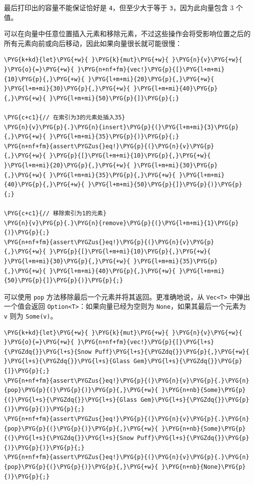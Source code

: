 最后打印出的容量不能保证恰好是 \texttt{4}，但至少大于等于 \texttt{3}，因为此向量包含 3 个值。

可以在向量中任意位置插入元素和移除元素，不过这些操作会将受影响位置之后的所有元素向前或向后移动，因此如果向量很长就可能很慢：

\begin{Verbatim}[commandchars=\\\{\},breaklines=true,breakanywhere=true,fontsize=\codefont,xleftmargin=17bp]
\PYG{k+kd}{let}\PYG{+w}{ }\PYG{k}{mut}\PYG{+w}{ }\PYG{n}{v}\PYG{+w}{ }\PYG{o}{=}\PYG{+w}{ }\PYG{n+nf+fm}{vec!}\PYG{p}{[}\PYG{l+m+mi}{10}\PYG{p}{,}\PYG{+w}{ }\PYG{l+m+mi}{20}\PYG{p}{,}\PYG{+w}{ }\PYG{l+m+mi}{30}\PYG{p}{,}\PYG{+w}{ }\PYG{l+m+mi}{40}\PYG{p}{,}\PYG{+w}{ }\PYG{l+m+mi}{50}\PYG{p}{]}\PYG{p}{;}

\PYG{c+c1}{// 在索引为3的元素处插入35}
\PYG{n}{v}\PYG{p}{.}\PYG{n}{insert}\PYG{p}{(}\PYG{l+m+mi}{3}\PYG{p}{,}\PYG{+w}{ }\PYG{l+m+mi}{35}\PYG{p}{)}\PYG{p}{;}
\PYG{n+nf+fm}{assert\PYGZus{}eq!}\PYG{p}{(}\PYG{n}{v}\PYG{p}{,}\PYG{+w}{ }\PYG{p}{[}\PYG{l+m+mi}{10}\PYG{p}{,}\PYG{+w}{ }\PYG{l+m+mi}{20}\PYG{p}{,}\PYG{+w}{ }\PYG{l+m+mi}{30}\PYG{p}{,}\PYG{+w}{ }\PYG{l+m+mi}{35}\PYG{p}{,}\PYG{+w}{ }\PYG{l+m+mi}{40}\PYG{p}{,}\PYG{+w}{ }\PYG{l+m+mi}{50}\PYG{p}{]}\PYG{p}{)}\PYG{p}{;}

\PYG{c+c1}{// 移除索引为1的元素}
\PYG{n}{v}\PYG{p}{.}\PYG{n}{remove}\PYG{p}{(}\PYG{l+m+mi}{1}\PYG{p}{)}\PYG{p}{;}
\PYG{n+nf+fm}{assert\PYGZus{}eq!}\PYG{p}{(}\PYG{n}{v}\PYG{p}{,}\PYG{+w}{ }\PYG{p}{[}\PYG{l+m+mi}{10}\PYG{p}{,}\PYG{+w}{ }\PYG{l+m+mi}{30}\PYG{p}{,}\PYG{+w}{ }\PYG{l+m+mi}{35}\PYG{p}{,}\PYG{+w}{ }\PYG{l+m+mi}{40}\PYG{p}{,}\PYG{+w}{ }\PYG{l+m+mi}{50}\PYG{p}{]}\PYG{p}{)}\PYG{p}{;}
\end{Verbatim}

可以使用 \texttt{pop} 方法移除最后一个元素并将其返回。更准确地说，从 \texttt{Vec<T>} 中弹出一个值会返回 \texttt{Option<T>}：如果向量已经为空则为 \texttt{None}，如果其最后一个元素为 \texttt{v} 则为 \texttt{Some(v)}。

\begin{Verbatim}[commandchars=\\\{\},breaklines=true,breakanywhere=true,fontsize=\codefont,xleftmargin=17bp]
\PYG{k+kd}{let}\PYG{+w}{ }\PYG{k}{mut}\PYG{+w}{ }\PYG{n}{v}\PYG{+w}{ }\PYG{o}{=}\PYG{+w}{ }\PYG{n+nf+fm}{vec!}\PYG{p}{[}\PYG{l+s}{\PYGZdq{}}\PYG{l+s}{Snow Puff}\PYG{l+s}{\PYGZdq{}}\PYG{p}{,}\PYG{+w}{ }\PYG{l+s}{\PYGZdq{}}\PYG{l+s}{Glass Gem}\PYG{l+s}{\PYGZdq{}}\PYG{p}{]}\PYG{p}{;}
\PYG{n+nf+fm}{assert\PYGZus{}eq!}\PYG{p}{(}\PYG{n}{v}\PYG{p}{.}\PYG{n}{pop}\PYG{p}{(}\PYG{p}{)}\PYG{p}{,}\PYG{+w}{ }\PYG{n+nb}{Some}\PYG{p}{(}\PYG{l+s}{\PYGZdq{}}\PYG{l+s}{Glass Gem}\PYG{l+s}{\PYGZdq{}}\PYG{p}{)}\PYG{p}{)}\PYG{p}{;}
\PYG{n+nf+fm}{assert\PYGZus{}eq!}\PYG{p}{(}\PYG{n}{v}\PYG{p}{.}\PYG{n}{pop}\PYG{p}{(}\PYG{p}{)}\PYG{p}{,}\PYG{+w}{ }\PYG{n+nb}{Some}\PYG{p}{(}\PYG{l+s}{\PYGZdq{}}\PYG{l+s}{Snow Puff}\PYG{l+s}{\PYGZdq{}}\PYG{p}{)}\PYG{p}{)}\PYG{p}{;}
\PYG{n+nf+fm}{assert\PYGZus{}eq!}\PYG{p}{(}\PYG{n}{v}\PYG{p}{.}\PYG{n}{pop}\PYG{p}{(}\PYG{p}{)}\PYG{p}{,}\PYG{+w}{ }\PYG{n+nb}{None}\PYG{p}{)}\PYG{p}{;}
\end{Verbatim}

